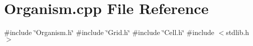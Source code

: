 \section{Organism.\+cpp File Reference}
\label{Organism_8cpp}
{\ttfamily \#include \char`\"{}Organism.\+h\char`\"{}}\newline
{\ttfamily \#include \char`\"{}Grid.\+h\char`\"{}}\newline
{\ttfamily \#include \char`\"{}Cell.\+h\char`\"{}}\newline
{\ttfamily \#include $<$stdlib.\+h$>$}\newline
